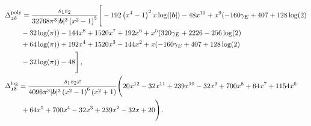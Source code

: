 \begin{align}
    \begin{split}
  &\Delta_{\mathfrak{26}}^{\textrm{poly}}=\frac{s_1s_2}{32768 \pi ^3 |\boldsymbol{b}|^3 \left(x^2-1\right)^5}\Bigg[-192 \left(x^4-1\right)^2 x \log (|\boldsymbol{b}|)-48 x^{10}+x^9 (-160 \gamma_E +407+128 \log (2)\\&\hspace{0.8cm}-32 \log (\pi ))-144 x^8+1520 x^7+192 x^6+x^5 (320 \gamma_E +2226-256 \log (2)\\&\hspace{0.8cm}+64 \log (\pi ))+192 x^4+1520 x^3-144 x^2+x (-160 \gamma_E +407+128 \log (2)\\&\hspace{0.8cm}-32 \log (\pi ))-48\Bigg]\,,\\&
\Delta_{\mathfrak{18}}^{\textrm{log}}=\frac{s_{1} s_{2} x}{4096 \pi ^3 |\boldsymbol{b}|^3 \left(x^2-1\right)^6 \left(x^2+1\right)}\Bigg(20 x^{12}-32 x^{11}+239 x^{10}-32 x^9+700 x^8+64 x^7+1154 x^6\\&\hspace{0.8cm}+64 x^5+700 x^4-32 x^3+239 x^2-32 x+20\Bigg)\,.
      \end{split}
\end{align}
